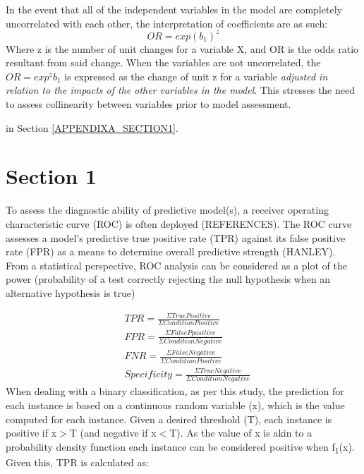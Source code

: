 In the event that all of the independent variables in the model are completely uncorrelated with each other, the interpretation of coefficients are as such:
\begin{equation}
OR = exp(b_1)^z
\end{equation}
Where z is the number of unit changes for a variable X, and OR is the odds ratio resultant from said change. When the variables are not uncorrelated, the $OR = exp^zb_1$ is expressed as the change of unit z for a variable \textit{adjusted in relation to the impacts of the other variables in the model}. This stresses the need to assess collinearity between variables prior to model assessment.


   in 
Section \ref{APPENDIXA_SECTION1}.

\section{Section 1}\label{ROC_Curve}
To assess the diagnostic ability of predictive model(s), a receiver operating characteristic curve (ROC) is often deployed (REFERENCES). The ROC curve assesses a model's predictive true positive rate (TPR) against its false positive rate (FPR) as a means to determine overall predictive strength (HANLEY). From a statistical perspective, ROC analysis can be considered as a plot of the power (probability of a test correctly rejecting the null hypothesis when an alternative hypothesis is true) 

\begin{equation}
\begin{aligned}
& TPR = \frac{\Sigma True Positive}{\Sigma Condition Positive} \\
& FPR = \frac{\Sigma False Ppositive}{\Sigma Condition Negative} \\
& FNR = \frac{\Sigma False Negative}{\Sigma Condition Positive} \\ 
& Specificity = \frac{\Sigma True Negative}{\Sigma Condition Negative} 
\end{aligned}
\end{equation}
When dealing with a binary classification, as per this study, the prediction for each instance is based on a continuous random variable (x), which is the value computed for each instance. Given a desired threshold (T), each instance is positive if x$>$T (and negative if x$<$T). As the value of x is akin to a probability density function each instance can be considered positive when f\textsubscript{1}(x). Given this, TPR is calculated as:

